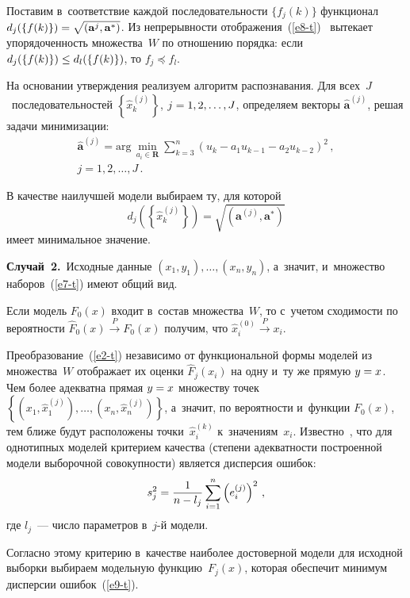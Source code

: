 \begin{multicols}{2}
  Поставим в~соответствие каждой последовательности $\{f_j(k)\}$ 
функционал $d_j(\{f(k)\}) \hm= \sqrt{(\mathbf{a}^j, \mathbf{a}^*)}$. Из 
непрерывности отображения~(\ref{e8-t})~\cite{10-t} вытекает упорядоченность 
множества~$W$ по отношению порядка: если $d_j (\{ f(k)\})\hm\leq d_l (\{ 
f(k)\})$, то $f_j \preceq f_l$.
  
  На основании утверждения реализуем алгоритм распознавания. Для 
всех~$J$~последовательностей $\left\{ \hat{x}_k^{(j)}\right\}$, $j\hm= 1,2,\ldots 
,J$, определяем векторы $\hat{\mathbf{a}}^{(j)}$, решая задачи минимизации:
 \begin{multline*}
  \hat{\mathbf{a}}^{(j)} = \mathrm{arg}\,\min\limits_{a_i\in \mathbf{R}}  
\sum\limits_{k=3}^n \left( u_k -a_1 u_{k-1} -a_2 u_{k-2}\right)^2\,,\\ 
j=1,2,\ldots ,J\,.
  \end{multline*}
  
  В качестве наилучшей модели выбираем ту, для которой
  $$
  d_j \left( \left\{ \hat{x}_k^{(j)}\right\} \right) = \sqrt{\left( \mathbf{a}^{(j)}, 
\mathbf{a}^*\right)}
  $$
имеет минимальное значение.

\smallskip
  
  \noindent
  \textbf{Случай~2.}\ Исходные данные $(x_1,y_1),\ldots, (x_n,y_n)$, а~значит, 
и~множество наборов~(\ref{e7-t}) имеют общий вид.
  
  Если модель $F_0(x)$ входит в~состав множества~$W$, то с~учетом 
сходимости по вероятности $\hat{F}_0(x) \overset{P}{\to} F_0(x)$ получим, что 
$\hat{x}^{(0)}_i \overset{P}{\to} x_i$.
  
  Преобразование~(\ref{e2-t}) независимо от функциональной формы моделей 
из множества~$W$ отображает их оценки $\hat{F}_j(x_i)$ на одну и~ту же 
прямую $y\hm= x$. Чем более адекватна прямая $y\hm=x$ множеству точек 
$\left\{ \left(x_1,\hat{x}_1^{(j)}\right),\ldots , 
\left(x_n,\hat{x}_n^{(j)}\right)\right\}$, а~значит, по 
ве\-ро\-ят\-ности и~функции $F_0(x)$, тем ближе будут расположены 
точки~$\hat{x}_i^{(k)}$ к~значениям~$x_i$. Известно~\cite{8-t, 11-t}, что для 
однотипных моделей критерием качества (степени адекватности построенной 
модели выборочной совокупности) является дисперсия ошибок:
  \begin{equation}
  s_j^2 = \displaystyle\frac{\displaystyle 1\mathstrut}{\displaystyle n-l_j\mathstrut} \sum\limits_{i=1}^n \left( e_i^{(j)} \right)^2\,,
  \label{e9-t}
  \end{equation}
где $l_j$~--- число параметров в~$j$-й модели.
  
  Согласно этому критерию в~качестве наиболее достоверной модели для 
исходной выборки выбираем модельную функцию~$F_j(x)$, которая обеспечит 
минимум дисперсии ошибок~(\ref{e9-t}).


\end{multicols}
